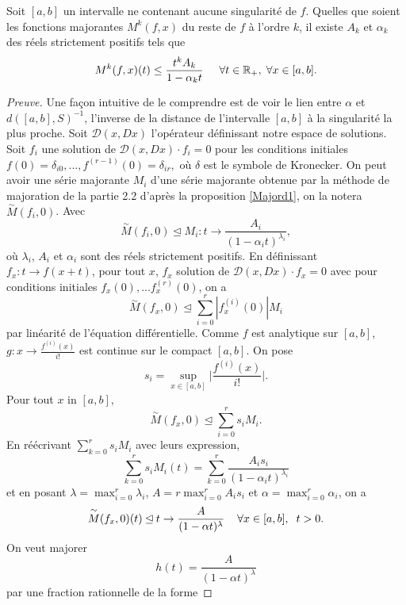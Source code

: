\documentclass[a4paper,10pt]{article}
\begin{document}
	\begin{proposition}
		Soit $[a,b]$ un intervalle ne contenant aucune singularité de $f$. Quelles que soient les fonctions majorantes $M^k(f,x)$ du reste de $f$ à l'ordre $k$, il existe $A_k$ et $\alpha_k$ des réels strictement positifs tels que 
		\[M^k(f,x)(t) \leq \frac{t^kA_k}{1-\alpha_k t} \hspace{5mm} \forall t \in \mathbb{R}_+,\hspace{1mm} \forall x \in [a,b].\] 
		\label{Maj_maj}
	\end{proposition}
	\begin{proof}[Preuve]
		Une façon intuitive de le comprendre est de voir le lien entre $\alpha$ et $d([a,b],S)^{-1}$, l'inverse de la distance de l'intervalle $[a,b]$ à la singularité la plus proche. Soit $\mathcal{D}(x,Dx)$ l'opérateur définissant notre espace de solutions.\\
		Soit $f_i$ une solution de $\mathcal{D}(x,Dx)\cdot f_i=0$ pour les conditions initiales $f(0)=\delta_{i0},...,f^{(r-1)}(0)=\delta_{ir},$ où $\delta$ est le symbole de Kronecker. On peut avoir une série majorante $M_i$ d'une série majorante obtenue par la méthode de majoration de la partie 2.2 d'après la proposition \ref{Majord1}, on la notera $\overset{\sim}{M}(f_i,0)$. Avec
		\[\overset{\sim}{M}(f_i,0) \unlhd  M_i:t\rightarrow\frac{A_i}{(1-\alpha_i t)^{\lambda_i}},\]
		où $\lambda_i$, $A_i$ et $\alpha_i$ sont des réels strictement positifs. 
		En définissant $f_x: t\rightarrow f(x+t)$, pour tout $x$, $f_x$ solution de $\mathcal{D}(x,Dx)\cdot f_x=0$ avec pour conditions initiales $f_x(0),...f_x^{(r)}(0)$, on a 
		\[\overset{\sim}{M}(f_x,0) \unlhd \sum_{i=0}^{r} |f_x^{(i)}(0)| M_i\]
		par linéarité de l'équation différentielle.
		Comme $f$ est analytique sur $[a,b]$, $g: x\rightarrow\frac{f^{(i)}(x)}{i!}$ est continue sur le compact $[a,b]$. On pose
		\[s_i=\sup_{x \in [a,b]} \Big|\frac{f^{(i)}(x)}{i!}\Big|.\]
		Pour tout $x$ in $[a,b]$,
		\[\overset{\sim}{M}(f_x,0) \unlhd \sum_{i=0}^{r}s_iM_i.\]
		En réécrivant  $\sum_{k=0}^{r}s_iM_i$ avec leurs expression,
		\[\sum_{k=0}^{r}s_iM_i(t)=\sum_{k=0}^{r}\frac{A_is_i}{(1-\alpha_i t)^{\lambda_i}}\]
		et en posant $\lambda=\max_{i=0}^{r}\lambda_i$, $A=r\max_{i=0}^{r}A_is_i$ et $\alpha=\max_{i=0}^{r}\alpha_i$, on a 
		\[\overset{\sim}{M}(f_x,0)(t) \unlhd t \rightarrow\frac{A}{(1-\alpha t)^{\lambda}} \hspace{4mm} \forall x \in [a,b], \hspace{2mm} t>0.\]
		On veut majorer 
		\[h(t)=\frac{A}{(1-\alpha t)^{\lambda}}\]
		par une fraction rationnelle de la forme

\end{proof}
\end{document}
